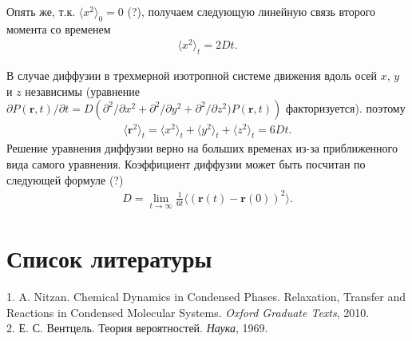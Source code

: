 \documentclass[14pt]{extarticle}
\newcommand{\vr}{\mathbf{r}}
\newcommand{\lb}{\left(}
\newcommand{\rb}{\right)}
\begin{document}
Опять же, т.к. $\langle x^2 \rangle_0 = 0$ (?), получаем следующую линейную связь второго момента со временем
\begin{gather}
	\langle x^2 \rangle_t = 2 D t. \label{1.207}
\end{gather}

В случае диффузии в трехмерной изотропной системе движения вдоль осей $x$, $y$ и $z$ независимы (уравнение $\partial P(\vr, t)/\partial t = D\lb \partial^2/\partial x^2 + \partial^2 / \partial y^2 + \partial^2 / \partial z^2) P(\vr, t) \rb$ факторизуется). поэтому
\begin{gather}
	\langle \vr^2 \rangle_t = \langle x^2 \rangle_t + \langle y^2 \rangle_t + \langle z^2 \rangle_t = 6 D t. \label{1.208}
\end{gather}
Решение уравнения диффузии верно на больших временах из-за приближенного вида самого уравнения. Коэффициент диффузии может быть посчитан по следующей формуле (?)
\begin{gather}
	D = \lim_{t \rightarrow \infty} \frac{1}{6t} \langle \lb \vr(t) - \vr(0) \rb^2 \rangle. \label{1.209}
\end{gather}


\newpage
\section{Список литературы}
1. A. Nitzan. Chemical Dynamics in Condensed Phases. Relaxation, Transfer and Reactions in Condensed Molecular Systems. \textit{Oxford Graduate Texts}, 2010. \\
2. Е. С. Вентцель. Теория вероятностей. \textit{Наука}, 1969.
\end{document}
